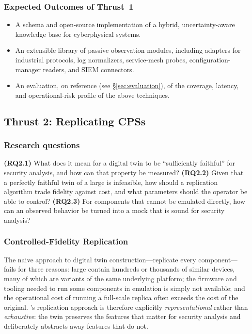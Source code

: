 \subsubsection{Expected Outcomes of Thrust~1}
\begin{itemize}[leftmargin=1.3em,itemsep=0.1em,topsep=0.2em]
  \item A schema and open-source implementation of a hybrid,
  uncertainty-aware knowledge base for cyberphysical systems.
  \item An extensible library of passive observation modules, including
  adapters for industrial protocols, log normalizers, service-mesh
  probes, configuration-manager readers, and SIEM connectors.
  \item An evaluation, on reference \CPSs (see
  \S\ref{sec:evaluation}), of the coverage, latency, and
  operational-risk profile of the above techniques.
\end{itemize}

\subsection{Thrust 2: Replicating CPSs}
\label{sec:thrust2}

\subsubsection*{Research questions}
\textbf{(RQ2.1)} What does it mean for a digital twin to be
``sufficiently faithful'' for security analysis, and how can that
property be measured?
\textbf{(RQ2.2)} Given that a perfectly faithful twin of a large \cps
is infeasible, how should a replication algorithm trade fidelity
against cost, and what parameters should the operator be able to
control?
\textbf{(RQ2.3)} For components that cannot be emulated directly, how
can an observed behavior be turned into a mock that is sound for
security analysis?

\subsubsection{Controlled-Fidelity Replication}

The naive approach to digital twin construction---replicate every
component---fails for three reasons: large \CPSs contain hundreds or
thousands of similar devices, many of which are variants of the same
underlying platform; the firmware and tooling needed to run some
components in emulation is simply not available; and the operational
cost of running a full-scale replica often exceeds the cost of the
original. \sysname's replication approach is therefore explicitly
\emph{representational} rather than \emph{exhaustive}: the twin
preserves the features that matter for security analysis and
deliberately abstracts away features that do not.

